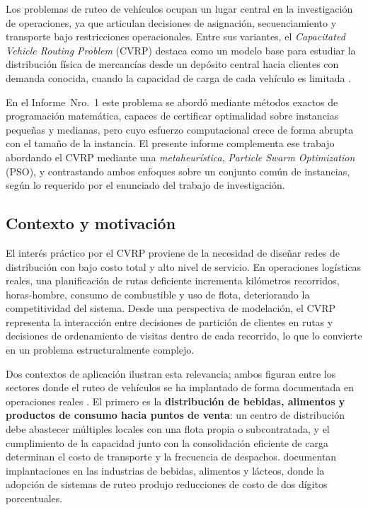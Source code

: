 Los problemas de ruteo de vehículos ocupan un lugar central en la investigación de
operaciones, ya que articulan decisiones de asignación, secuenciamiento y transporte
bajo restricciones operacionales. Entre sus variantes, el \textit{Capacitated Vehicle
Routing Problem} (CVRP) destaca como un modelo base para estudiar la distribución
física de mercancías desde un depósito central hacia clientes con demanda conocida,
cuando la capacidad de carga de cada vehículo es limitada
\parencite{toth2002vehicle}.

En el Informe~Nro.~1 este problema se abordó mediante métodos exactos de programación
matemática, capaces de certificar optimalidad sobre instancias pequeñas y medianas,
pero cuyo esfuerzo computacional crece de forma abrupta con el tamaño de la instancia.
El presente informe complementa ese trabajo abordando el CVRP mediante una
\textit{metaheurística}, \textit{Particle Swarm Optimization} (PSO), y contrastando
ambos enfoques sobre un conjunto común de instancias, según lo requerido por el
enunciado del trabajo de investigación.

\subsection{Contexto y motivación}

El interés práctico por el CVRP proviene de la necesidad de diseñar redes de
distribución con bajo costo total y alto nivel de servicio. En operaciones logísticas
reales, una planificación de rutas deficiente incrementa kilómetros recorridos,
horas-hombre, consumo de combustible y uso de flota, deteriorando la competitividad del
sistema. Desde una perspectiva de modelación, el CVRP representa la interacción entre
decisiones de partición de clientes en rutas y decisiones de ordenamiento de visitas
dentro de cada recorrido, lo que lo convierte en un problema estructuralmente complejo.

Dos contextos de aplicación ilustran esta relevancia; ambos figuran entre los sectores
donde el ruteo de vehículos se ha implantado de forma documentada en operaciones reales
\parencite{golden2002routing}. El primero es la \textbf{distribución de bebidas, alimentos
y productos de consumo hacia puntos de venta}: un centro de distribución debe abastecer
múltiples locales con una flota propia o subcontratada, y el cumplimiento de la capacidad
junto con la consolidación eficiente de carga determinan el costo de transporte y la
frecuencia de despachos. \textcite{golden2002routing} documentan implantaciones en las
industrias de bebidas, alimentos y lácteos, donde la adopción de sistemas de ruteo produjo
reducciones de costo de dos dígitos porcentuales.

